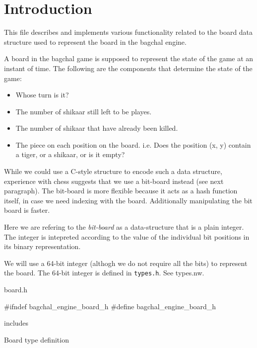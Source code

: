 \documentclass{article}\usepackage{noweb}\pagestyle{noweb}%
\begin{document}
\nwdocspar
\section{Introduction}
This file describes and implements various functionality related
to the board data structure used to represent the board in the
bagchal engine.

A board in the bagchal game is supposed to represent the state
of the game at an instant of time. The following are the components
that determine the state of the game:

\begin{itemize}

\item Whose turn is it?
\item The number of shikaar still left to be playes.
\item The number of shikaar that have already been killed.
\item The piece on each position on the board. i.e. Does the position
      (x, y) contain a tiger, or a shikaar, or is it empty?

\end{itemize}

While we could use a C-style structure to encode such a data
structure, experience with chess suggests that we use a bit-board
instead (see next paragraph). The bit-board is more flexible because
it acts as a hash function itself, in case we need indexing with the
board. Additionally manipulating the bit board is faster.

Here we are refering to the {\em bit-board} as a data-structure that
is a plain integer. The integer is intepreted according to the value of
the individual bit positions in its binary representation.

We will use a 64-bit integer (althogh we do not require all the bits) to
represent the board. The 64-bit integer is defined in \texttt{types.h}.
See types.nw.

\nwenddocs{}\moddef{*}\endmoddef\nwstartdeflinemarkup\nwenddeflinemarkup
  \LA{}board.h\RA{}

\nwendcode{}\endmoddef\nwstartdeflinemarkup\nwenddeflinemarkup

#ifndef bagchal_engine_board_h
#define bagchal_engine_board_h

\LA{}includes\RA{}

\LA{}Board type definition\RA{}
\end{document}
